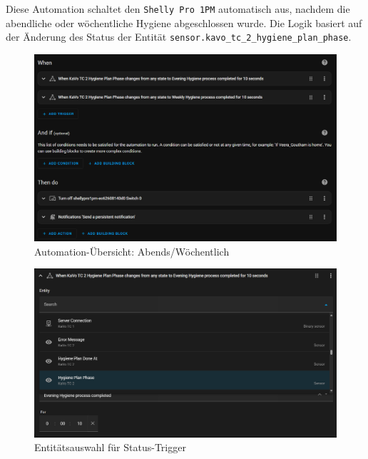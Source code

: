 Diese Automation schaltet den \texttt{Shelly Pro 1PM} automatisch aus, nachdem die abendliche oder wöchentliche Hygiene abgeschlossen wurde. Die Logik basiert auf der Änderung des Status der Entität \texttt{sensor.kavo\_tc\_2\_hygiene\_plan\_phase}.

\begin{figure}[H]
  \centering
  \includegraphics[width=\linewidth]{images/turnoff_overview.png}
  \caption{Automation-Übersicht: Abends/Wöchentlich}
\end{figure}

\begin{figure}[H]
  \centering
  \includegraphics[width=\linewidth]{images/turnoff_triggerentity.png}
  \caption{Entitätsauswahl für Status-Trigger}
\end{figure}

